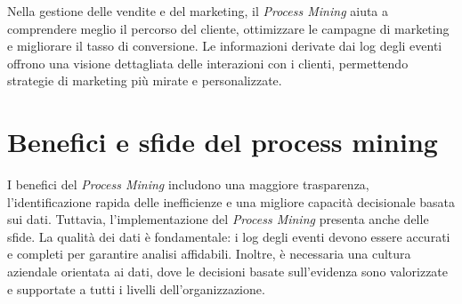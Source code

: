\documentclass{article}
\begin{document}
Nella gestione delle vendite e del marketing, il \textit{Process Mining} aiuta a comprendere meglio il percorso del cliente, ottimizzare le campagne di marketing e migliorare il tasso di conversione. Le informazioni derivate dai log degli eventi offrono una visione dettagliata delle interazioni con i clienti, permettendo strategie di marketing più mirate e personalizzate.\\

\section{Benefici e sfide del process mining}
I benefici del \textit{Process Mining} includono una maggiore trasparenza, l'identificazione rapida delle inefficienze e una migliore capacità decisionale basata sui dati. Tuttavia, l'implementazione del \textit{Process Mining} presenta anche delle sfide. La qualità dei dati è fondamentale: i log degli eventi devono essere accurati e completi per garantire analisi affidabili. Inoltre, è necessaria una cultura aziendale orientata ai dati, dove le decisioni basate sull'evidenza sono valorizzate e supportate a tutti i livelli dell'organizzazione.
\end{document}
